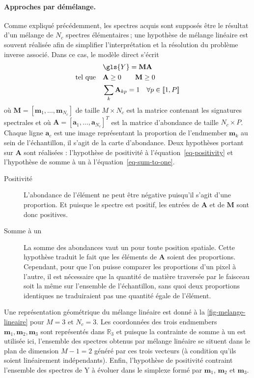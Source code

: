     \paragraph{Approches par démélange.} Comme expliqué précédemment, les spectres acquis sont supposés être le résultat d'un mélange de $N_c$ spectres élémentaires\,; une hypothèse de mélange linéaire est souvent réalisée afin de simplifier l'interprétation et la résolution du problème inverse associé. Dans ce cas, le modèle direct s'écrit~\cite{dobigeon2016linear}
    \begin{align}
    &\gls{Y} = \mathbf{M}\mathbf{A}\\
    \text{tel que}\quad &\mathbf{A} \geq 0\qquad \mathbf{M} \geq 0\label{eq-positivity}\\
    &\sum_k \mathbf{A}_{kp} = 1 \quad \forall p\in\llbracket 1 , P \rrbracket \label{eq-sum-to-one}
    \end{align}
    où $\mathbf{M}=[\mathbf{m}_1,\dots,\mathbf{m}_{N_c}]$ de taille $M\times N_c$ est la matrice contenant les signatures spectrales et où $\mathbf{A} = [\mathbf{a}_1,\dots,\mathbf{a}_{N_c}]^T$ est la matrice d'abondance de taille $N_c\times P$. Chaque ligne $\mathbf{a}_c$ est une image représentant la proportion de l'endmember $\mathbf{m}_k$ au sein de l'échantillon, il s'agit de la carte d'abondance. Deux hypothèses portant sur $\mathbf{A}$ sont réalisées : l'hypothèse de positivité à l'équation~\eqref{eq-positivity} et l'hypothèse de somme à un à l'équation~\eqref{eq-sum-to-one}.
    \begin{description}
        \item[Positivité] L'abondance de l'élément ne peut être négative puisqu'il s'agit d'une proportion. Et puisque le spectre est positif, les entrées de $\mathbf{A}$ et de $\mathbf{M}$ sont donc positives.
        \item[Somme à un] La somme des abondances vaut un pour toute position spatiale. Cette hypothèse traduit le fait que les éléments de $\mathbf{A}$ soient des proportions. Cependant, pour que l'on puisse comparer les proportions d'un pixel à l'autre, il est nécessaire que la quantité de matière traversée par le faisceau soit la même sur l'ensemble de l'échantillon, sans quoi deux proportions identiques ne traduiraient pas une quantité égale de l'élément.
    \end{description}
    Une représentation géométrique du mélange linéaire est donné à la \cref{fig-melange-lineaire} pour $M=3$ et $N_c=3$. Les coordonnées des trois endmembers $\mathbf{m}_1,\mathbf{m}_2,\mathbf{m}_3$ sont représentés dans $\mathbb{R}_3$ et puisque la contrainte de somme à un est utilisée ici, l'ensemble des spectres obtenus par mélange linéaire se situent dans le plan de dimension $M-1=2$ généré par ces trois vecteurs (à condition qu'ils soient linéairement indépendants). Enfin, l'hypothèse de positivité contraint l'ensemble des spectres de \gls{Y} à évoluer dans le simplexe formé par $\mathbf{m}_1$, $\mathbf{m}_2$ et $\mathbf{m}_3$.
